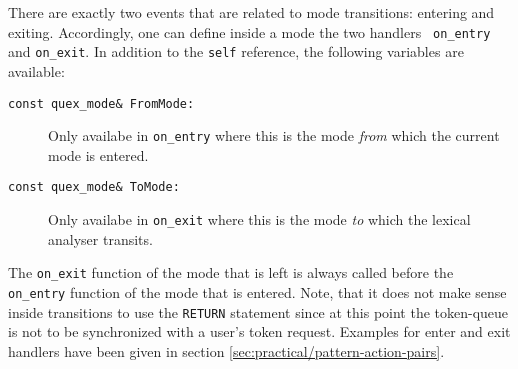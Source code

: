 There are exactly two events that are related to mode transitions: entering
and exiting. Accordingly, one can define inside a mode the two handlers {\tt
on\_entry} and {\tt on\_exit}. In addition to the {\tt self} reference, the
following variables are available:

\begin{description}
\item[\tt const quex\_mode\& FromMode:] Only availabe in {\tt on\_entry} where
  this is the mode {\it from} which the current mode is entered.

\item[\tt const quex\_mode\& ToMode:] Only availabe in {\tt on\_exit} where
  this is the mode {\it to} which the lexical analyser transits.
\end{description}

The {\tt on\_exit} function of the mode that is left is always called before
the {\tt on\_entry} function of the mode that is entered. Note, that it does
not make sense inside transitions to use the {\tt RETURN} statement since at
this point the token-queue is not to be synchronized with a user's token
request. Examples for enter and exit handlers have been given in section
\ref{sec:practical/pattern-action-pairs}.





